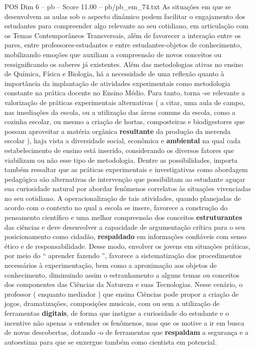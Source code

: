 \begin{textsample}{POS Dim 6 – pb – Score 11.00 – pb/pb\_em\_74.txt}
As situações em que se desenvolvem as aulas sob o aspecto dinâmico podem facilitar o engajamento dos estudantes para compreender algo relevante ao seu cotidiano, em articulação com os Temas Contemporâneos Transversais, além de favorecer a interação entre os pares, entre professores-estudantes e entre estudantes-objetos de conhecimento, mobilizando emoções que auxiliam a compreensão de novos conceitos ou ressignificando os saberes já existentes.
Além das metodologias ativas no ensino de Química, Física e Biologia, há a necessidade de uma reflexão quanto à importância da implantação de atividades experimentais como metodologia constante na prática docente no Ensino Médio.
Para tanto, torna -se relevante a valorização de práticas experimentais alternativas ( a citar, uma aula de campo, nas imediações da escola, ou a utilização das áreas comuns da escola, como a cozinha escolar, ou mesmo a criação de hortas, composteiras e biodigestores que possam aproveitar a matéria orgânica \textbf{resultante} da produção da merenda escolar ), haja vista a diversidade social, econômica e \textbf{ambiental} na qual cada estabelecimento de ensino está inserido, considerando os diversos fatores que viabilizam ou não esse tipo de metodologia.
Dentre as possibilidades, importa também ressaltar que as práticas experimentais e investigativas como abordagem pedagógica são alternativas de intervenção que possibilitam ao estudante aguçar sua curiosidade natural por abordar fenômenos correlatos às situações vivenciadas no seu cotidiano.
A operacionalização de tais atividades, quando planejadas de acordo com o contexto no qual a escola se insere, favorece a construção do pensamento científico e uma melhor compreensão dos conceitos \textbf{estruturantes} das ciências e deve desenvolver a capacidade de argumentação crítica para o seu posicionamento como cidadão, \textbf{respaldado} em informações confiáveis com senso ético e de responsabilidade.
Desse modo, envolver os jovens em situações práticas, por meio do “ aprender fazendo ”, favorece a sistematização dos procedimentos necessários à experimentação, bem como a aproximação aos objetos de conhecimento, diminuindo assim o estranhamento a alguns temas ou conceitos dos componentes das Ciências da Natureza e suas Tecnologias.
Nesse cenário, o professor ( enquanto mediador ) que ensina Ciências pode propor a criação de jogos, dramatizações, composições musicais, com ou sem a utilização de ferramentas \textbf{digitais}, de forma que instigue a curiosidade do estudante e o incentive não apenas a entender os fenômenos, mas que os motive a ir em busca de novas descobertas, dotando -o de ferramentas que \textbf{respaldam} a segurança e a autoestima para que se enxergue também como cientista em potencial.

\end{textsample}
